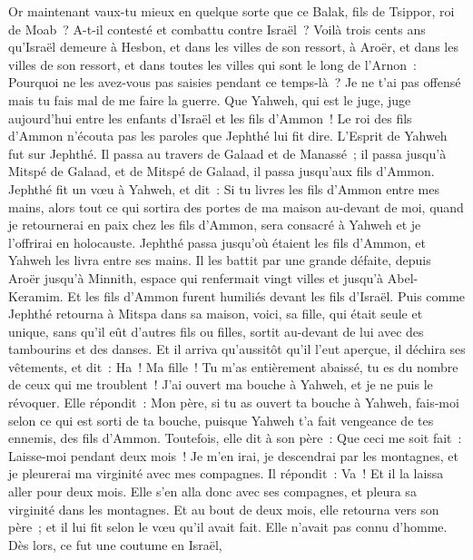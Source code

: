 \begin{multicols}{2}
Or maintenant vaux-tu mieux en quelque sorte que ce Balak, fils de Tsippor, roi de Moab~? A-t-il contesté et combattu contre Israël~?
Voilà trois cents ans qu'Israël demeure à Hesbon, et dans les villes de son ressort, à Aroër, et dans les villes de son ressort, et dans toutes les villes qui sont le long de l'Arnon~: Pourquoi ne les avez-vous pas saisies pendant ce temps-là~?
Je ne t'ai pas offensé mais tu fais mal de me faire la guerre. Que Yahweh, qui est le juge, juge aujourd'hui entre les enfants d'Israël et les fils d'Ammon~!
Le roi des fils d'Ammon n'écouta pas les paroles que Jephthé lui fit dire.
L'Esprit de Yahweh fut sur Jephthé. Il passa au travers de Galaad et de Manassé~; il passa jusqu'à Mitspé de Galaad, et de Mitspé de Galaad, il passa jusqu'aux fils d'Ammon.
Jephthé fit un vœu à Yahweh, et dit~: Si tu livres les fils d'Ammon entre mes mains,
alors tout ce qui sortira des portes de ma maison au-devant de moi, quand je retournerai en paix chez les fils d'Ammon, sera consacré à Yahweh et je l'offrirai en holocauste.
Jephthé passa jusqu'où étaient les fils d'Ammon, et Yahweh les livra entre ses mains.
Il les battit par une grande défaite, depuis Aroër jusqu'à Minnith, espace qui renfermait vingt villes et jusqu'à Abel-Keramim. Et les fils d'Ammon furent humiliés devant les fils d'Israël.
Puis comme Jephthé retourna à Mitspa dans sa maison, voici, sa fille, qui était seule et unique, sans qu'il eût d'autres fils ou filles, sortit au-devant de lui avec des tambourins et des danses.
Et il arriva qu'aussitôt qu'il l'eut aperçue, il déchira ses vêtements, et dit~: Ha~! Ma fille~! Tu m'as entièrement abaissé, tu es du nombre de ceux qui me troublent~! J'ai ouvert ma bouche à Yahweh, et je ne puis le révoquer.
Elle répondit~: Mon père, si tu as ouvert ta bouche à Yahweh, fais-moi selon ce qui est sorti de ta bouche, puisque Yahweh t'a fait vengeance de tes ennemis, des fils d'Ammon.
Toutefois, elle dit à son père~: Que ceci me soit fait~: Laisse-moi pendant deux mois~! Je m'en irai, je descendrai par les montagnes, et je pleurerai ma virginité avec mes compagnes.
Il répondit~: Va~! Et il la laissa aller pour deux mois. Elle s'en alla donc avec ses compagnes, et pleura sa virginité dans les montagnes.
Et au bout de deux mois, elle retourna vers son père~; et il lui fit selon le vœu qu'il avait fait. Elle n'avait pas connu d'homme. Dès lors, ce fut une coutume en Israël,

\end{multicols}
